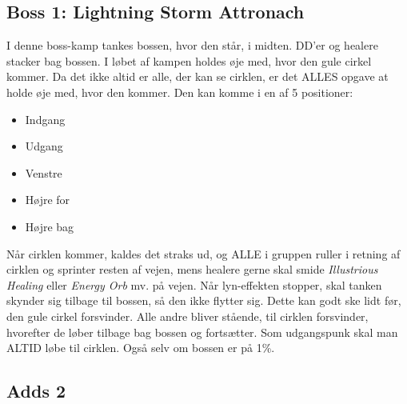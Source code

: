 \subsection*{Boss 1: Lightning Storm Attronach}
I denne boss-kamp tankes bossen, hvor den står, i midten. DD'er og healere
stacker bag bossen. I løbet af kampen holdes øje med, hvor den gule cirkel
kommer. Da det ikke altid er alle, der kan se cirklen, er det ALLES opgave at
holde øje med, hvor den kommer. Den kan komme i en af 5 positioner:
\begin{itemize}
  \item Indgang
  \item Udgang
  \item Venstre
  \item Højre for
  \item Højre bag
\end{itemize}
Når cirklen kommer, kaldes det straks ud, og ALLE i gruppen ruller i retning af
cirklen og sprinter resten af vejen, mens healere gerne skal smide
\emph{Illustrious Healing} eller \emph{Energy Orb} mv. på vejen. Når
lyn-effekten stopper, skal tanken skynder sig tilbage til bossen, så den ikke
flytter sig. Dette kan godt ske lidt før, den gule cirkel forsvinder. Alle
andre bliver stående, til cirklen forsvinder, hvorefter de løber tilbage bag
bossen og fortsætter. Som udgangspunk skal man ALTID løbe til cirklen. Også
selv om bossen er på 1\%.
\subsection*{Adds 2}


